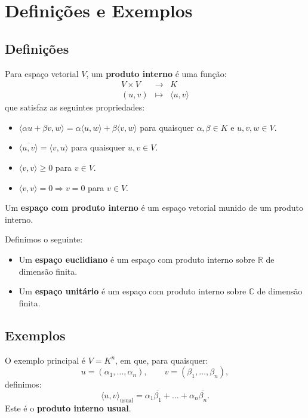 \documentclass[11pt,twoside,a4paper]{book}
\begin{document}
\section{Definições e Exemplos}

\subsection{Definições}

\begin{definicao}
Para espaço vetorial $V$, um \textbf{produto interno} é uma função:
\[
\begin{array}{rcl}
V\times V&\rightarrow&K\\
(u,v)&\mapsto&\langle u,v\rangle
\end{array}
\]
que satisfaz as seguintes propriedades:
\begin{itemize}
\item $\langle\alpha u+\beta v,w\rangle=\alpha\langle u,w\rangle+\beta\langle v,w\rangle$ para quaisquer $\alpha,\beta\in K$ e $u,v,w\in V$.
\item $\overline{\langle u,v\rangle}=\langle v,u\rangle$ para quaisquer $u,v\in V$.
\item $\langle v,v\rangle\geq 0$ para $v\in V$.
\item $\langle v,v\rangle=0\Rightarrow v=0$ para $v\in V$.
\end{itemize}
\end{definicao}

\begin{definicao}
Um \textbf{espaço com produto interno} é um espaço vetorial munido de um produto interno.
\end{definicao}

\begin{definicao}
Definimos o seguinte:
\begin{itemize}
\item Um \textbf{espaço euclidiano} é um espaço com produto interno sobre $\mathbb{R}$ de dimensão finita.
\item Um \textbf{espaço unitário} é um espaço com produto interno sobre $\mathbb{C}$ de dimensão finita.
\end{itemize}
\end{definicao}

\subsection{Exemplos}

\begin{exemplo}
O exemplo principal é $V=K^n$, em que, para quaisquer:
\[
u=(\alpha_1,\dots,\alpha_n),\quad\quad v=(\beta_1,\dots,\beta_n),
\]
definimos:
\[
\langle u,v\rangle_{\text{usual}}=\alpha_1\overline{\beta_1}+\dots+\alpha_n\overline{\beta_n}.
\]
Este é o \textbf{produto interno usual}.
\end{exemplo}
\end{document}
